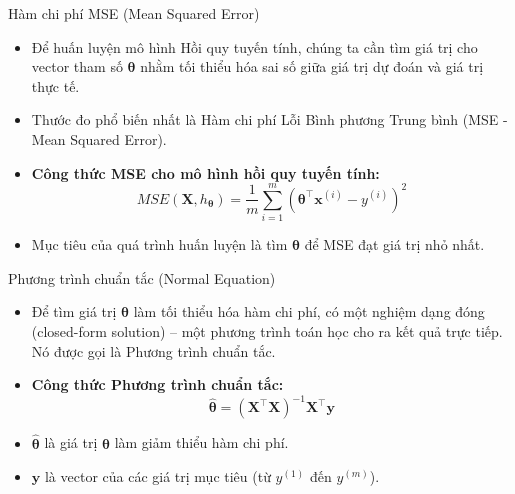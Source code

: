 \documentclass[aspectratio=169]{beamer}
\begin{document}
\begin{frame}{Hàm chi phí MSE (Mean Squared Error)}
\begin{itemize}
    \item Để huấn luyện mô hình Hồi quy tuyến tính, chúng ta cần tìm giá trị cho vector tham số $\boldsymbol{\theta}$ nhằm tối thiểu hóa sai số giữa giá trị dự đoán và giá trị thực tế.
    \item Thước đo phổ biến nhất là Hàm chi phí Lỗi Bình phương Trung bình (MSE - Mean Squared Error).
    \item \textbf{Công thức MSE cho mô hình hồi quy tuyến tính:}
    \begin{equation}
    MSE(\mathbf{X}, h_{\boldsymbol{\theta}}) = \frac{1}{m} \sum_{i=1}^{m} \left( \boldsymbol{\theta}^\top \mathbf{x}^{(i)} - y^{(i)} \right)^2
    \end{equation}
    \item Mục tiêu của quá trình huấn luyện là tìm $\boldsymbol{\theta}$ để MSE đạt giá trị nhỏ nhất.
\end{itemize}
\end{frame}

\begin{frame}{Phương trình chuẩn tắc (Normal Equation)}
\begin{itemize}
    \item Để tìm giá trị $\boldsymbol{\theta}$ làm tối thiểu hóa hàm chi phí, có một nghiệm dạng đóng (closed-form solution) – một phương trình toán học cho ra kết quả trực tiếp. Nó được gọi là Phương trình chuẩn tắc.
    \item \textbf{Công thức Phương trình chuẩn tắc:}
    \begin{equation}
    \hat{\boldsymbol{\theta}} = (\mathbf{X}^\top \mathbf{X})^{-1} \mathbf{X}^\top \mathbf{y}
    \end{equation}
    \item $\hat{\boldsymbol{\theta}}$ là giá trị $\boldsymbol{\theta}$ làm giảm thiểu hàm chi phí.
    \item $\mathbf{y}$ là vector của các giá trị mục tiêu (từ $y^{(1)}$ đến $y^{(m)}$).
\end{itemize}
\end{frame}
\end{document}
